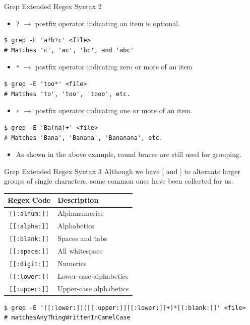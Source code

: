 \documentclass[11pt]{beamer}
\begin{document}
\begin{frame}[fragile=singleslide]{Grep Extended Regex Syntax 2}
\begin{itemize}
\item \texttt{?} $\rightarrow$ postfix operator indicating an item is optional. 
\end{itemize}
\begin{lstlisting}[style=terminal]
$ grep -E 'a?b?c' <file>
# Matches 'c', 'ac', 'bc', and 'abc' 
\end{lstlisting}
\begin{itemize}
\item \texttt{*} $\rightarrow$ postfix operator indicating zero or more of an item 
\end{itemize}
\begin{lstlisting}[style=terminal]
$ grep -E 'too*' <file>
# Matches 'to', 'too', 'tooo', etc.
\end{lstlisting}
\begin{itemize}
\item \texttt{+} $\rightarrow$ postfix operator indicating one or more of an item.
\end{itemize}
\begin{lstlisting}[style=terminal]
$ grep -E 'Ba(na)+' <file>
# Matches 'Bana', 'Banana', 'Bananana', etc.
\end{lstlisting}
\begin{itemize}
\item As shown in the above example, round braces are still used for grouping. 
\end{itemize}
\end{frame}

\begin{frame}[fragile=singleslide]{Grep Extended Regex Syntax 3}
Although we have [ and ] to alternate larger groups of single characters, some common ones have been collected for us.
\vspace{0.5em}
\center 
\begin{tabular}{| c | l |}
\hline
Regex Code & Description \\ \hline
\texttt{[[:alnum:]]} & Alphanumerics \\ \hline
\texttt{[[:alpha:]]} & Alphabetics \\ \hline
\texttt{[[:blank:]]} & Spaces and tabs \\ \hline
\texttt{[[:space:]]} & All whitespace \\ \hline
\texttt{[[:digit:]]} & Numerics \\ \hline
\texttt{[[:lower:]]} & Lower-case alphabetics \\ \hline
\texttt{[[:upper:]]} & Upper-case alphabetics \\ \hline
\end{tabular}
\flushleft
\begin{lstlisting}[style=terminal]
$ grep -E '[[:lower:]]([[:upper:]][[:lower:]]+)*[[:blank:]]' <file>
# matchesAnyThingWrittenInCamelCase 
\end{lstlisting}
\end{frame}
\end{document}
